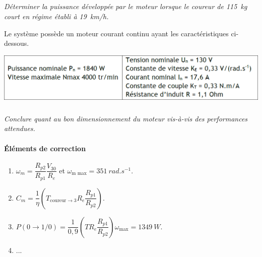 \documentclass[10pt,fleqn]{article} %
\begin{document}
\begin{multicols}{2}
\subparagraph{}
\textit{Déterminer la puissance développée par le moteur lorsque le coureur de \SI{115}{kg} court en régime
établi à \SI{19}{km/h}.}
\ifprof
\begin{corrige}
\end{corrige}\else\fi
Le système possède
un moteur courant
continu ayant les
caractéristiques ci-dessous.

\begin{center}
\includegraphics[width=\linewidth]{images/fig_03.png}
\end{center}

\subparagraph{}
\textit{Conclure quant au bon dimensionnement du moteur vis-à-vis des performances attendues.}
\ifprof
\begin{corrige}
\end{corrige}\else\fi

\vspace{1cm}
\footnotesize
\paragraph*{Éléments de correction}
\begin{enumerate}
\item $\omega_m=\dfrac{R_{p2}}{R_{p1}}\dfrac{V_{30}}{R_e}$ et $\omega_{\text{m max}}=\SI{351}{rad.s^{-1}}$.
\item $C_m=\dfrac{1}{\eta}\left( T_{\text{coureur}\rightarrow 3} R_e \dfrac{R_{p1}}{R_{p2}}\right)$.
\item $P\left(0\to1/0 \right)=\dfrac{1}{0,9}\left(T R_e \dfrac{R_{p1}}{R_{p2}} \right) \omega_{\text{max}}=\SI{1349}{W}$.
\item ...
\end{enumerate}


\ifprof
\else
\end{multicols}
\fi

\newpage
\end{document}
